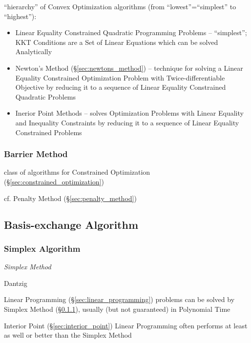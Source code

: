 ``hierarchy'' of Convex Optimization algorithms (from ``lowest''=``simplest'' to
``highest''):
\begin{itemize}
  \item Linear Equality Constrained Quadratic Programming Problems --
    ``simplest''; KKT Conditions are a Set of Linear Equations which can be
    solved Analytically
  \item Newton's Method (\S\ref{sec:newtons_method}) -- technique for solving a
    Linear Equality Constrained Optimization Problem with Twice-differentiable
    Objective by reducing it to a sequence of Linear Equality Constrained
    Quadratic Problems
  \item Inerior Point Methods -- solves Optimization Problems with Linear
    Equality and Inequality Constraints by reducing it to a sequence of Linear
    Equality Constrained Problems
\end{itemize}



\subsubsection{Barrier Method}\label{sec:barrier_method}

class of algorithms for Constrained Optimization
(\S\ref{sec:constrained_optimization})

cf. Penalty Method (\S\ref{sec:penalty_method})



\subsection{Basis-exchange Algorithm}\label{sec:basis_exchange}

\subsubsection{Simplex Algorithm}\label{sec:simplex_algorithm}

\emph{Simplex Method}

Dantzig

Linear Programming (\S\ref{sec:linear_programming}) problems can be solved by
Simplex Method (\S\ref{sec:simplex_algorithm}), usually (but not guaranteed) in
Polynomial Time

\fist Interior Point (\S\ref{sec:interior_point}) Linear Programming often
performs at least as well or better than the Simplex Method

